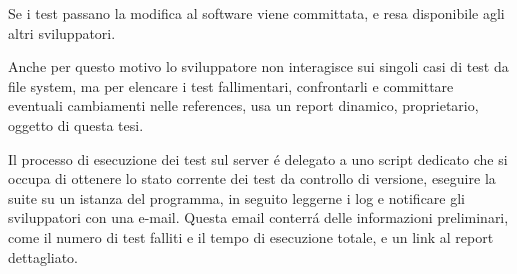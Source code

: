             Se i test passano la modifica al software viene committata, e resa disponibile agli altri sviluppatori.
            
            Anche per questo motivo lo sviluppatore non interagisce sui singoli casi di test da file system,
            ma per elencare i test fallimentari, confrontarli e committare eventuali cambiamenti nelle references, usa un report dinamico, 
            proprietario, oggetto di questa tesi.

            Il processo di esecuzione dei test sul server \'e delegato a uno script dedicato che si occupa di ottenere lo stato corrente dei test da controllo di versione,
            eseguire la suite su un istanza del programma, in seguito leggerne i log e notificare gli sviluppatori con una e-mail.
            Questa email conterr\'a delle informazioni preliminari, come il numero di test falliti e il tempo di esecuzione totale, e un link al report dettagliato.

